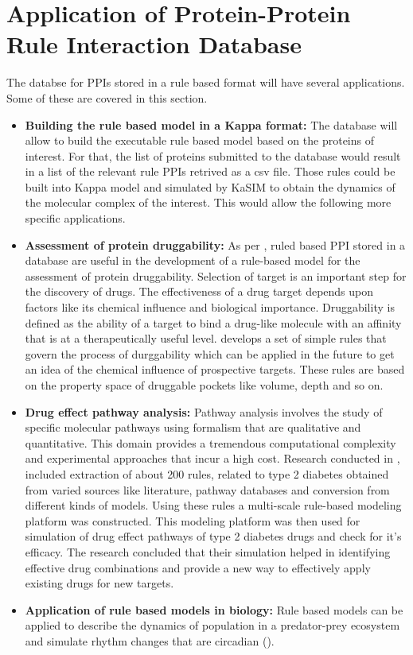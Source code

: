 \documentclass[msc,deptreport,ai]{infthesis}      %
\begin{document}
\section{Application of Protein-Protein Rule Interaction Database}
The databse for PPIs stored in a rule based format will have several applications. Some of these are covered in this section.
\begin{itemize}
	\item
	\textbf{Building the rule based model in a Kappa format:} The database will allow to build the executable rule based model based on the proteins of interest. For that, the list of proteins submitted to the database would result in a list of the relevant rule PPIs retrived as a csv file. Those rules could be built into Kappa model and simulated by KaSIM to obtain the dynamics of the molecular complex of the interest. This would allow the following more specific applications.
	\item
	\textbf{Assessment of protein druggability:} As per \cite{druggability}, ruled based PPI stored in a database are useful in the development of a rule-based model for the assessment of protein druggability. Selection of target is an important step for the discovery of drugs. The effectiveness of a drug target depends upon factors like  its chemical influence and biological importance. Druggability is defined as the ability of a target to bind a drug-like molecule with an affinity that is at a therapeutically useful level. \cite{druggability} develops a set of simple rules that govern the process of durggability which can be applied in the future to get an idea of the chemical influence of prospective targets. These rules are based on the property space of druggable pockets like volume, depth and so on.
	\item 
	\textbf{Drug effect pathway analysis:} Pathway analysis involves the study of specific molecular pathways using formalism that are qualitative and quantitative. This domain provides a tremendous computational complexity and experimental approaches that incur a high cost. Research conducted in \cite{ruleMultiscale}, included extraction of about 200 rules, related to type 2 diabetes obtained from varied sources like literature, pathway databases and conversion from different kinds of models. Using these rules \cite{ruleMultiscale} a multi-scale rule-based modeling platform was constructed. This modeling platform was then used for simulation of drug effect pathways of type 2 diabetes drugs and check for it's efficacy. The research concluded that their simulation helped in identifying effective drug combinations and provide a new way to effectively apply existing drugs for new targets.
	\item
	\textbf{Application of rule based models in biology:} Rule based models can be applied to describe the dynamics of population in a predator-prey ecosystem and simulate rhythm changes that are circadian (\cite{rule_based}).
\end{itemize}
\end{document}
